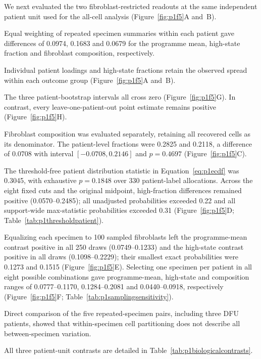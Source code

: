 \documentclass[10pt,a4paper]{article}
\begin{document}
We next evaluated the two fibroblast-restricted readouts at the same independent patient unit used for the all-cell analysis (Figure~\ref{fig:p1f5}A and~B).

Equal weighting of repeated specimen summaries within each patient gave differences of 0.0974, 0.1683 and 0.0679 for the programme mean, high-state fraction and fibroblast composition, respectively.

Individual patient loadings and high-state fractions retain the observed spread within each outcome group (Figure~\ref{fig:p1f5}A and~B).

The three patient-bootstrap intervals all cross zero (Figure~\ref{fig:p1f5}G). In contrast, every leave-one-patient-out point estimate remains positive (Figure~\ref{fig:p1f5}H).

Fibroblast composition was evaluated separately, retaining all recovered cells as its denominator. The patient-level fractions were 0.2825 and 0.2118, a difference of 0.0708 with interval $[-0.0708,0.2146]$ and $p=0.4697$ (Figure~\ref{fig:p1f5}C).

The threshold-free patient distribution statistic in Equation~\eqref{eq:p1ecdf} was 0.3045, with exhaustive $p=0.1848$ over 330 patient-label allocations. Across the eight fixed cuts and the original midpoint, high-fraction differences remained positive (0.0570--0.2485); all unadjusted probabilities exceeded 0.22 and all support-wide max-statistic probabilities exceeded 0.31 (Figure~\ref{fig:p1f5}D; Table~\ref{tab:p1thresholdpatient}).

Equalizing each specimen to 100 sampled fibroblasts left the programme-mean contrast positive in all 250 draws (0.0749--0.1233) and the high-state contrast positive in all draws (0.1098--0.2229); their smallest exact probabilities were 0.1273 and 0.1515 (Figure~\ref{fig:p1f5}E). Selecting one specimen per patient in all eight possible combinations gave programme-mean, high-state and composition ranges of 0.0777--0.1170, 0.1284--0.2081 and 0.0440--0.0918, respectively (Figure~\ref{fig:p1f5}F; Table~\ref{tab:p1samplingsensitivity}).

Direct comparison of the five repeated-specimen pairs, including three DFU patients, showed that within-specimen cell partitioning does not describe all between-specimen variation.

All three patient-unit contrasts are detailed in Table~\ref{tab:p1biologicalcontrasts}.
\end{document}
